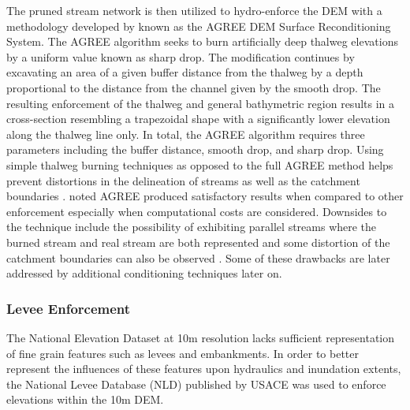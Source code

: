 The pruned stream network is then utilized to hydro-enforce the DEM with a methodology developed by  known as the AGREE DEM Surface Reconditioning System. 
The AGREE algorithm seeks to burn artificially deep thalweg elevations by a uniform value known as sharp drop. 
The modification continues by excavating an area of a given buffer distance from the thalweg by a depth proportional to the distance from the channel given by the smooth drop. 
The resulting enforcement of the thalweg and general bathymetric region results in a cross-section resembling a trapezoidal shape with a significantly lower elevation along the thalweg line only.
In total, the AGREE algorithm requires three parameters including the buffer distance, smooth drop, and sharp drop. 
Using simple thalweg burning techniques as opposed to the full AGREE method helps prevent distortions in the delineation of streams as well as the catchment boundaries \cite{saunders1995grid,saunders1996gis,mizgalewicz1996modeling,hellweger1997agree,quenzer1998gis,baker2006comparison}.
 noted AGREE produced satisfactory results when compared to other enforcement especially when computational costs are considered. 
Downsides to the technique include the possibility of exhibiting parallel streams where the burned stream and real stream are both represented \cite{hellweger1997agree,saunders1999preparation} and some distortion of the catchment boundaries can also be observed \cite{saunders1999preparation,saunders1996gis}. Some of these drawbacks are later addressed by additional conditioning techniques later on.
%
\subsubsection{Levee Enforcement}
%
The National Elevation Dataset at 10m resolution lacks sufficient representation of fine grain features such as levees and embankments.
In order to better represent the influences of these features upon hydraulics and inundation extents, the National Levee Database (NLD) published by USACE was used to enforce elevations within the 10m DEM.
%
